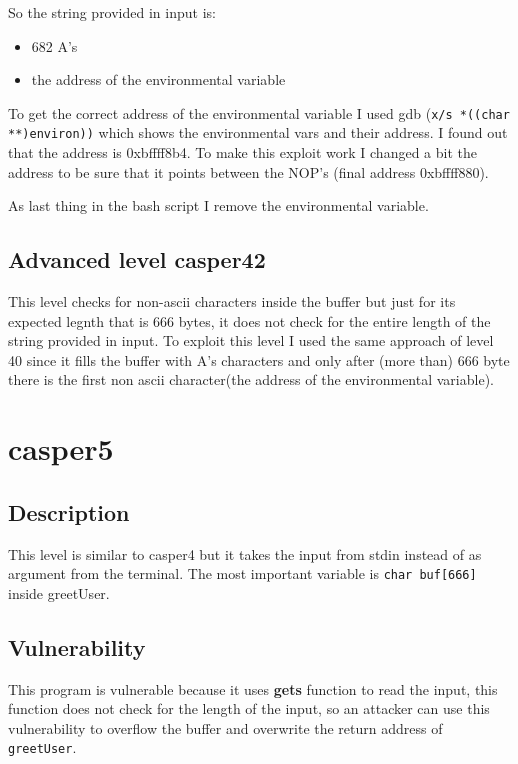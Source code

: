 \documentclass[a4paper,12pt]{article}
\begin{document}
So the string provided in input is:
\begin{itemize}
\item 682 A's
\item the address of the environmental variable
\end{itemize}

To get the correct address of the environmental variable I used gdb (\texttt{x/s *((char **)environ))} which shows the environmental vars and their address. I found out that the address is 0xbffff8b4. To make this exploit work I changed a bit the address to be sure that it points between the NOP's (final address 0xbffff880).

As last thing in the bash script I remove the environmental variable.

\subsection{Advanced level casper42}

This level checks for non-ascii characters inside the buffer but just for its expected legnth that is 666 bytes, it does not check for the entire length of the string provided in input. To exploit this level I used the same approach of level 40 since it fills the buffer with A's characters and only after (more than) 666 byte there is the first non ascii character(the address of the environmental variable).

\section{casper5}

\subsection{Description}
This level is similar to casper4 but it takes the input from stdin instead of as argument from the terminal.
The most important variable is \texttt{char buf[666]} inside greetUser.


\subsection{Vulnerability}
This program is vulnerable because it uses \textbf{gets} function to read the input, this function does not check for the length of the input, so an attacker can use this vulnerability to overflow the buffer and overwrite the return address of \texttt{greetUser}.
\end{document}
